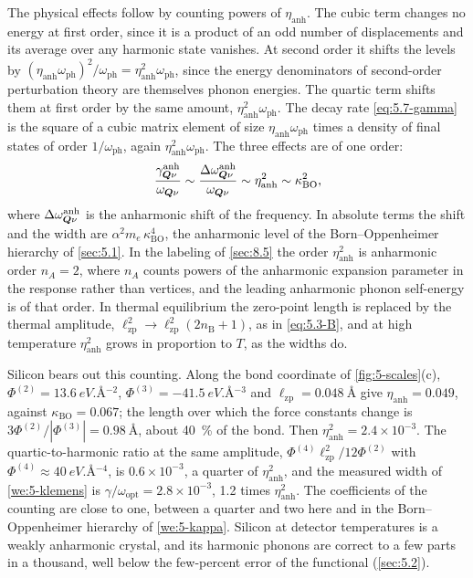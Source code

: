 The physical effects follow by counting powers of $\eta_{\mathrm{anh}}$. The cubic term changes no energy at first order, since it is a product of an odd number of displacements and its average over any harmonic state vanishes. At second order it shifts the levels by $(\eta_{\mathrm{anh}}\omega_{\mathrm{ph}})^2/\omega_{\mathrm{ph}} = \eta_{\mathrm{anh}}^2\omega_{\mathrm{ph}}$, since the energy denominators of second-order perturbation theory are themselves phonon energies. The quartic term shifts them at first order by the same amount, $\eta_{\mathrm{anh}}^2\omega_{\mathrm{ph}}$. The decay rate \cref{eq:5.7-gamma} is the square of a cubic matrix element of size $\eta_{\mathrm{anh}}\omega_{\mathrm{ph}}$ times a density of final states of order $1/\omega_{\mathrm{ph}}$, again $\eta_{\mathrm{anh}}^2\omega_{\mathrm{ph}}$. The three effects are of one order:
\begin{equation}
  \frac{\gamma^{\mathrm{anh}}_{\bm{Q}\nu}}{\omega_{\bm{Q}\nu}} \sim \frac{\Delta\omega^{\mathrm{anh}}_{\bm{Q}\nu}}{\omega_{\bm{Q}\nu}} \sim \eta_{\mathrm{anh}}^2 \sim \kappa_{\mathrm{BO}}^2 ,
  \label{eq:5.7-order}
\end{equation}
where $\Delta\omega^{\mathrm{anh}}_{\bm{Q}\nu}$ is the anharmonic shift of the frequency. In absolute terms the shift and the width are $\alpha^2m_e\,\kappa_{\mathrm{BO}}^4$, the anharmonic level of the Born--Oppenheimer hierarchy of \cref{sec:5.1}. In the labeling of \cref{sec:8.5} the order $\eta_{\mathrm{anh}}^2$ is anharmonic order $n_A = 2$, where $n_A$ counts powers of the anharmonic expansion parameter in the response rather than vertices, and the leading anharmonic phonon self-energy is of that order. In thermal equilibrium the zero-point length is replaced by the thermal amplitude, $\ell_{\mathrm{zp}}^2 \to \ell_{\mathrm{zp}}^2(2n_{\mathrm{B}} + 1)$, as in \cref{eq:5.3-B}, and at high temperature $\eta_{\mathrm{anh}}^2$ grows in proportion to $T$, as the widths do.

Silicon bears out this counting. Along the bond coordinate of \cref{fig:5-scales}(c), $\Phi^{(2)} = \SI{13.6}{eV.\angstrom^{-2}}$, $\Phi^{(3)} = \SI{-41.5}{eV.\angstrom^{-3}}$ and $\ell_{\mathrm{zp}} = \SI{0.048}{\angstrom}$ give $\eta_{\mathrm{anh}} = 0.049$, against $\kappa_{\mathrm{BO}} = 0.067$; the length over which the force constants change is $3\Phi^{(2)}/|\Phi^{(3)}| = \SI{0.98}{\angstrom}$, about \SI{40}{\percent} of the bond. Then $\eta_{\mathrm{anh}}^2 = 2.4\times10^{-3}$. The quartic-to-harmonic ratio at the same amplitude, $\Phi^{(4)}\ell_{\mathrm{zp}}^2/12\Phi^{(2)}$ with $\Phi^{(4)} \approx \SI{40}{eV.\angstrom^{-4}}$, is $0.6\times10^{-3}$, a quarter of $\eta_{\mathrm{anh}}^2$, and the measured width of \cref{we:5-klemens} is $\gamma/\omega_{\mathrm{opt}} = 2.8\times10^{-3}$, 1.2 times $\eta_{\mathrm{anh}}^2$. The coefficients of the counting are close to one, between a quarter and two here and in the Born--Oppenheimer hierarchy of \cref{we:5-kappa}. Silicon at detector temperatures is a weakly anharmonic crystal, and its harmonic phonons are correct to a few parts in a thousand, well below the few-percent error of the functional (\cref{sec:5.2}).

